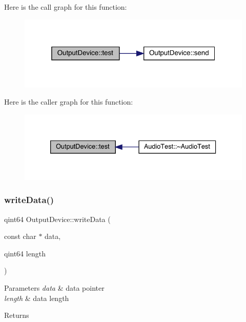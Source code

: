 Here is the call graph for this function\+:
\nopagebreak
\begin{figure}[H]
\begin{center}
\leavevmode
\includegraphics[width=319pt]{class_output_device_a78e2163a6f7051d49d3483234003d684_cgraph}
\end{center}
\end{figure}
Here is the caller graph for this function\+:
\nopagebreak
\begin{figure}[H]
\begin{center}
\leavevmode
\includegraphics[width=333pt]{class_output_device_a78e2163a6f7051d49d3483234003d684_icgraph}
\end{center}
\end{figure}
\mbox{\label{class_output_device_ab616ad1f0080ce753b511c08360bdde8}} 
\subsubsection{\texorpdfstring{write\+Data()}{writeData()}}
{\footnotesize\ttfamily qint64 Output\+Device\+::write\+Data (\begin{DoxyParamCaption}\item[{const char $\ast$}]{data,  }\item[{qint64}]{length }\end{DoxyParamCaption})}


\begin{DoxyParams}{Parameters}
{\em data} & data pointer \\
\hline
{\em length} & data length \\
\hline
\end{DoxyParams}
\begin{DoxyReturn}{Returns}

\end{DoxyReturn}


